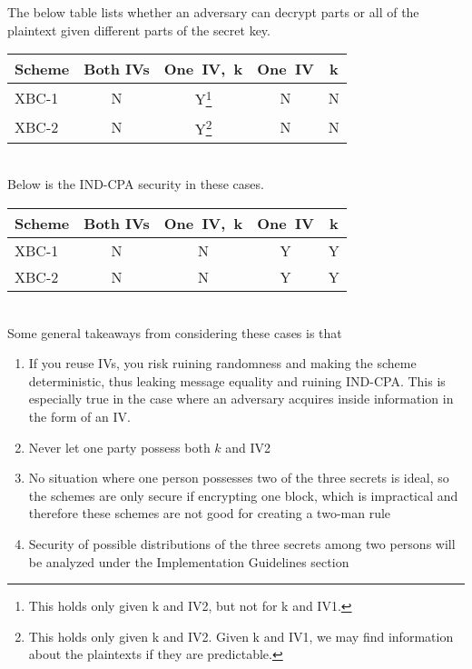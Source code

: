 \documentclass[conference]{IEEEtran}
\begin{document}
The below table lists whether an adversary can decrypt parts or all of the plaintext given different parts of the secret key. \\

\begin{minipage}{6cm} %
\begin{tabular}{| l | c c c c | }
\hline
  Scheme & Both IVs & One\ IV,\ k & One\ IV & k \\ \hline
  XBC-1 & N & Y\footnote{This holds only given k and IV2, but not for k and IV1.} & N & N \\
  XBC-2 & N & Y\footnote{This holds only given k and IV2. Given k and IV1, we may find information
  about the plaintexts if they are predictable.} & N & N \\
\hline  
\end{tabular}
\end{minipage} \\

Below is the IND-CPA security in these cases. \\

\begin{tabular}{| l | c c c c | }
\hline
  Scheme & Both IVs & One\ IV,\ k & One\ IV & k \\ \hline
  XBC-1 & N & N & Y & Y \\
  XBC-2 & N & N & Y & Y \\
\hline  
\end{tabular} \\

Some general takeaways from considering these cases is that

\begin{enumerate}
  \item If you reuse IVs, you risk ruining randomness and making the scheme deterministic, thus leaking message equality and ruining IND-CPA. This is especially true in the case where an adversary acquires inside information in the form of an IV.
  \item Never let one party possess both $k$ and IV2
  \item No situation where one person possesses two of the three secrets is ideal, so the schemes are only secure if encrypting one block, which is impractical and therefore these schemes are not good for creating a two-man rule
  \item Security of possible distributions of the three secrets among two persons will be analyzed under the Implementation Guidelines section
\end{enumerate}
\end{document}

